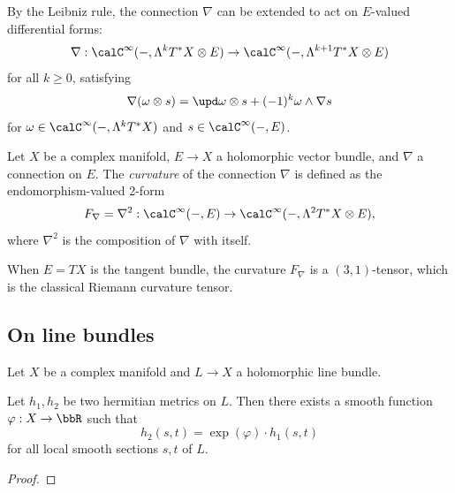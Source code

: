     By the Leibniz rule, the connection \(\nabla\) can be extended to act on \(E\)-valued differential forms:
    \[\nabla: \calC^\infty(-, \Lambda^k T^*X \otimes E) \to \calC^\infty(-, \Lambda^{k+1} T^*X \otimes E)\]
    for all \(k \geq 0\), satisfying
    \[\nabla(\omega \otimes s) = \upd\omega \otimes s + (-1)^k \omega \wedge \nabla s\]
    for \(\omega \in \calC^\infty(-, \Lambda^k T^*X)\) and \(s \in \calC^\infty(-, E)\).

    \begin{definition}\label{def:curvature_of_connection}
        Let \(X\) be a complex manifold, \(E \to X\) a holomorphic vector bundle, and \(\nabla\) a connection on \(E\).
        The \emph{curvature} of the connection \(\nabla\) is defined as the endomorphism-valued 2-form
        \[F_\nabla = \nabla^2: \calC^\infty(-, E) \to \calC^\infty(-, \Lambda^2 T^*X \otimes E),\]
        where \(\nabla^2\) is the composition of \(\nabla\) with itself.
    \end{definition}

    When \(E = TX\) is the tangent bundle, the curvature \(F_\nabla\) is a \((3,1)\)-tensor, which is the classical Riemann curvature tensor.

    \begin{example}\label{eg:curvature_of_Fubini_Study_metric}
    \end{example}




\subsection{On line bundles}

    Let \(X\) be a complex manifold and \(L \to X\) a holomorphic line bundle.

    \begin{proposition}\label{prop:hermitian_metric_different_by_a_smooth_function_on_a_fixed_line_bundle}
        Let \(h_1,h_2\) be two hermitian metrics on \(L\).
        Then there exists a smooth function \(\varphi: X \to \bbR\) such that
        \[h_2(s,t) = \exp(\varphi) \cdot h_1(s,t)\]
        for all local smooth sections \(s,t\) of \(L\).
    \end{proposition}
    \begin{proof}
    \end{proof}

